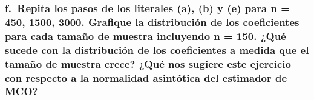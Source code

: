 \documentclass[
]{article}
\begin{document}
\hypertarget{f.-repita-los-pasos-de-los-literales-a-b-y-e-para-n-450-1500-3000.-grafique-la-distribuciuxf3n-de-los-coeficientes-para-cada-tamauxf1o-de-muestra-incluyendo-n-150.-quuxe9-sucede-con-la-distribuciuxf3n-de-los-coeficientes-a-medida-que-el-tamauxf1o-de-muestra-crece-quuxe9-nos-sugiere-este-ejercicio-con-respecto-a-la-normalidad-asintuxf3tica-del-estimador-de-mco}{%
\subsubsection{f.~Repita los pasos de los literales (a), (b) y (e) para
n = 450, 1500, 3000. Grafique la distribución de los coeficientes para
cada tamaño de muestra incluyendo n = 150. ¿Qué sucede con la
distribución de los coeficientes a medida que el tamaño de muestra
crece? ¿Qué nos sugiere este ejercicio con respecto a la normalidad
asintótica del estimador de
MCO?}\label{f.-repita-los-pasos-de-los-literales-a-b-y-e-para-n-450-1500-3000.-grafique-la-distribuciuxf3n-de-los-coeficientes-para-cada-tamauxf1o-de-muestra-incluyendo-n-150.-quuxe9-sucede-con-la-distribuciuxf3n-de-los-coeficientes-a-medida-que-el-tamauxf1o-de-muestra-crece-quuxe9-nos-sugiere-este-ejercicio-con-respecto-a-la-normalidad-asintuxf3tica-del-estimador-de-mco}}
\end{document}
